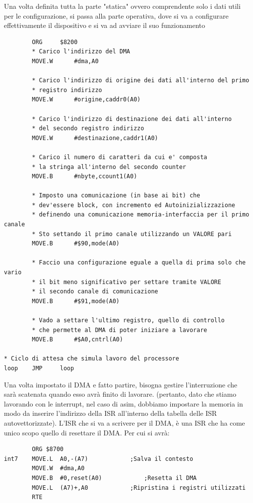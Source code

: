 Una volta definita tutta la parte "statica" ovvero comprendente solo i dati utili per le configurazione, si passa alla parte operativa, dove si va a configurare effettivamente il dispositivo e si va ad avviare il suo funzionamento
\begin{lstlisting}
        ORG 	$8200
        * Carico l'indirizzo del DMA
	    MOVE.W	    #dma,A0			

        * Carico l'indirizzo di origine dei dati all'interno del primo
        * registro indirizzo
	    MOVE.W  	#origine,caddr0(A0)
        
        * Carico l'indirizzo di destinazione dei dati all'interno
        * del secondo registro indirizzo
        MOVE.W  	#destinazione,caddr1(A0)		

        * Carico il numero di caratteri da cui e' composta
        * la stringa all'interno del secondo counter
	    MOVE.B  	#nbyte,ccount1(A0)		

        * Imposto una comunicazione (in base ai bit) che 
        * dev'essere block, con incremento ed Autoinizializzazione
        * definendo una comunicazione memoria-interfaccia per il primo canale
        * Sto settando il primo canale utilizzando un VALORE pari
        MOVE.B  	#$90,mode(A0)		

        * Faccio una configurazione eguale a quella di prima solo che vario
        * il bit meno significativo per settare tramite VALORE
        * il secondo canale di comunicazione
	    MOVE.B	    #$91,mode(A0)		

        * Vado a settare l'ultimo registro, quello di controllo
        * che permette al DMA di poter iniziare a lavorare
	    MOVE.B	    #$A0,cntrl(A0)			

* Ciclo di attesa che simula lavoro del processore
loop	JMP	    loop
\end{lstlisting}

Una volta impostato il DMA e fatto partire, bisogna gestire l'interruzione che sarà scatenata quando esso avrà finito di lavorare. (pertanto, dato che stiamo lavorando con le interrupt, nel caso di asim, dobbiamo impostare la memoria in modo da inserire l'indirizzo della ISR all'interno della tabella delle ISR autovettorizzate).
L'ISR che si va a scrivere per il DMA, è una ISR che ha come unico scopo quello di resettare il DMA. Per cui si avrà:
\begin{lstlisting}
	    ORG $8700
int7	MOVE.L	A0,-(A7)			;Salva il contesto
		MOVE.W	#dma,A0					
		MOVE.B	#0,reset(A0)			;Resetta il DMA
		MOVE.L	(A7)+,A0			;Ripristina i registri utilizzati
		RTE
\end{lstlisting}

